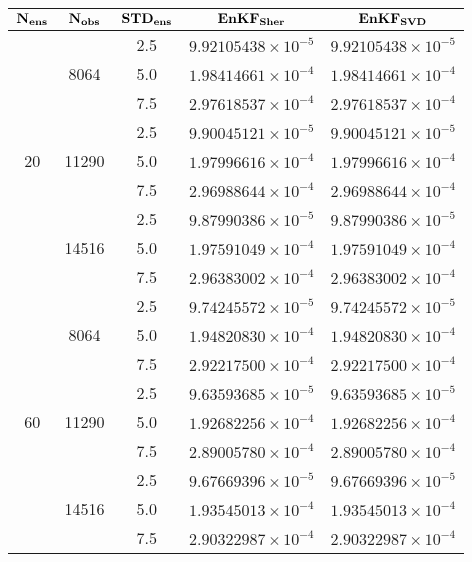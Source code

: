\documentclass[12pt]{article}
\begin{document}
\begin{table}[H]
\centering
{\footnotesize
\begin{tabular}{|c|c|c|c|c|} \hline
$\bf N_{ens}$ & $\bf N_{obs}$ & $\bf STD_{ens}$ & ${\bf EnKF_{Sher}}$ & ${\bf  EnKF_{SVD}  }$ \\ \hline
\multirow{9}{*}{20} &  \multirow{3}{*}{8064}  & 2.5 & $9.92105438 \times 10^{-5}$ & $9.92105438 \times 10^{-5} $ \\
& & 5.0 & $ 1.98414661 \times 10^{-4} $ & $ 1.98414661 \times 10^{-4} $   \\ 
& & 7.5 & $ 2.97618537 \times 10^{-4} $ & $ 2.97618537 \times 10^{-4} $   \\ 
\cline{2-5}
&  \multirow{3}{*}{11290}  & 2.5 & $ 9.90045121 \times 10^{-5} $ & $ 9.90045121 \times 10^{-5} $  \\
& & 5.0 & $ 1.97996616 \times 10^{-4} $ & $ 1.97996616 \times 10^{-4} $   \\ 
& & 7.5 & $ 2.96988644 \times 10^{-4} $ & $ 2.96988644 \times 10^{-4} $   \\ 
\cline{2-5}
&  \multirow{3}{*}{14516}  & 2.5 & $ 9.87990386 \times 10^{-5} $ & $ 9.87990386 \times 10^{-5} $  \\
& & 5.0 & $ 1.97591049 \times 10^{-4} $ & $ 1.97591049 \times 10^{-4} $   \\ 
& & 7.5 & $ 2.96383002 \times 10^{-4} $ & $ 2.96383002 \times 10^{-4} $   \\ 
\cline{1-5}
\multirow{9}{*}{60} &  \multirow{3}{*}{8064}  & 2.5 & $9.74245572 \times 10^{-5}$ & $9.74245572 \times 10^{-5} $ \\
& & 5.0 & $ 1.94820830 \times 10^{-4} $ & $ 1.94820830 \times 10^{-4} $   \\ 
& & 7.5 & $ 2.92217500 \times 10^{-4} $ & $ 2.92217500 \times 10^{-4} $   \\ 
\cline{2-5}
&  \multirow{3}{*}{11290}  & 2.5 & $ 9.63593685 \times 10^{-5} $ & $ 9.63593685 \times 10^{-5} $  \\
& & 5.0 & $ 1.92682256 \times 10^{-4} $ & $ 1.92682256 \times 10^{-4} $   \\ 
& & 7.5 & $ 2.89005780 \times 10^{-4} $ & $ 2.89005780 \times 10^{-4} $   \\ 
\cline{2-5}
&  \multirow{3}{*}{14516}  & 2.5 & $ 9.67669396 \times 10^{-5} $ & $ 9.67669396 \times 10^{-5} $  \\
& & 5.0 & $ 1.93545013 \times 10^{-4} $ & $ 1.93545013 \times 10^{-4} $   \\ 
& & 7.5 & $ 2.90322987 \times 10^{-4} $ & $ 2.90322987 \times 10^{-4} $   \\ 

\end{tabular}}
\end{table}
\end{document}
